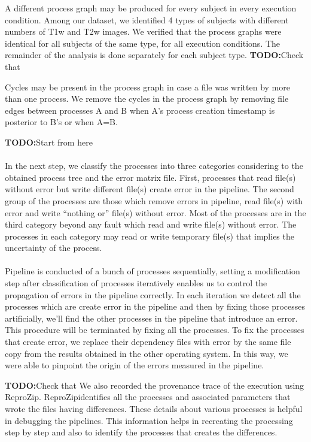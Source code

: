 \documentclass{article}
\newcommand{\todo}[1]{\color{red}\textbf{TODO:}#1\color{black}}
\newcommand{\reprozip}[0]{ReproZip}
\begin{document}
A different process graph may be produced for every subject in every
execution condition. Among our dataset, we identified 4 types of
subjects with different numbers of T1w and T2w images. We verified
that the process graphs were identical for all subjects of the same
type, for all execution conditions. The remainder of the analysis is
done separately for each subject type. \todo{Check that}

Cycles may be present in the process graph in case a file was written
by more than one process.  We remove the cycles in the process graph
by removing file edges between processes A and B when A's process
creation timestamp is posterior to B's or when A=B.

\todo{Start from here}
\paragraph{} In the next step, we classify the processes into three categories considering to the obtained process tree 
and the error matrix file. First, processes that read file(s) without error but write different file(s) create error in 
the pipeline. The second group of the processes are those which remove errors in pipeline, read file(s) with error and
 write “nothing or” file(s) without error. Most of the processes are in the third category beyond any fault which
 read and write file(s) without error. The processes in each category may read or write temporary file(s) that implies 
the uncertainty of the process.
\paragraph{} Pipeline is conducted of a bunch of processes sequentially, setting a modification step after classification
 of processes iteratively enables us to control the propagation of errors in the pipeline correctly. In each iteration
 we detect all the processes which are create error in the pipeline and then by fixing those processes artificially, 
we’ll find the other processes in the pipeline that introduce an error. This procedure will be terminated by fixing all the processes. 
To fix the processes that create error, we replace their dependency files with error by the same file copy from the results 
obtained in the other operating system. In this way, we were able to pinpoint the origin of the errors measured in the pipeline.

\todo{Check that} We also recorded the provenance trace of the execution using \reprozip. \reprozip identifies all the
processes and associated parameters that wrote the files having
differences.  These details about various processes is helpful in
debugging the pipelines. This information helps in recreating the
processing step by step and also to identify the processes that
creates the differences.
\end{document}
